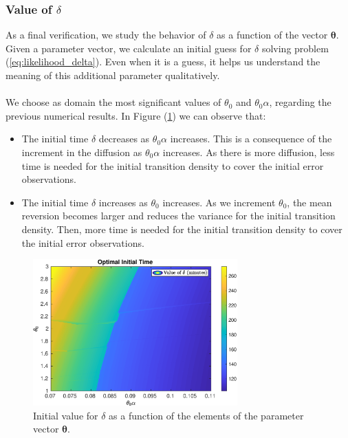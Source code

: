 \documentclass[11pt]{article}
\theoremstyle{definition}
\begin{document}
\subsubsection{Value of $\delta$}
As a final verification, we study the behavior of $\delta$ as a function of the vector $\bm{\theta}$. Given a parameter vector, we calculate an initial guess for $\delta$ solving problem (\ref{eq:likelihood_delta}). Even when it is a guess, it helps us understand the meaning of this additional parameter qualitatively.\\
\quad\\
We choose as domain the most significant values of $\theta_0$ and $\theta_0\alpha$, regarding the previous numerical results. In Figure (\ref{fig:delta}) we can observe that:
\begin{itemize}
\item The initial time $\delta$ decreases as $\theta_0\alpha$ increases. This is a consequence of the increment in the diffusion as $\theta_0\alpha$ increases. As there is more diffusion, less time is needed for the initial transition density to cover the initial error observations.
\item The initial time $\delta$ increases as $\theta_0$ increases. As we increment $\theta_0$, the mean reversion becomes larger and reduces the variance for the initial transition density. Then, more time is needed for the initial transition density to cover the initial error observations.\end{itemize}

\begin{figure}[H]
\centering
\includegraphics[width=0.7\textwidth]{plots/delta/contour_delta.eps}
\caption{Initial value for $\delta$ as a function of the elements of the parameter vector $\bm{\theta}$.}
\label{fig:delta}
\end{figure}

\end{document}
